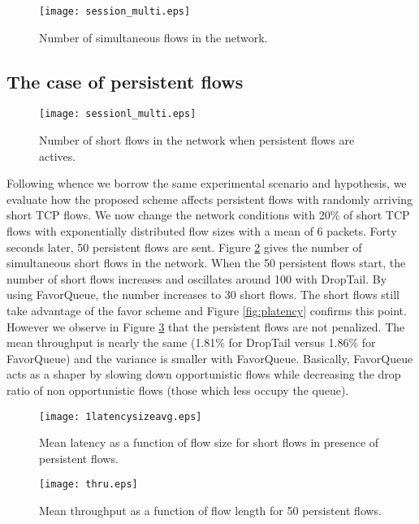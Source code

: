 \documentclass{elsart}
\begin{document}
\begin{figure}[ht]
\begin{center}
\texttt{[image: session\_multi.eps]}
\end{center}
\caption{Number of simultaneous flows in the network.}
\label{fig:session}
\end{figure}

\subsection{The case of persistent flows}
\label{subsec:persistent}

\begin{figure}[htb!]
\begin{center}
\texttt{[image: sessionl\_multi.eps]}
\end{center}
\caption{Number of short flows in the network when persistent flows are actives.}
\label{fig:sessionl}
\end{figure}


Following \cite{avrachenkov04} whence we borrow the same experimental scenario and hypothesis, we evaluate how the proposed scheme affects persistent flows with randomly arriving short TCP flows.
We now change the network conditions with 20\% of short TCP flows with exponentially distributed flow sizes with a mean of 6 packets. Forty seconds later, 50 persistent flows are sent. Figure \ref{fig:sessionl} gives 
the number of simultaneous short flows in the network. When the 50 persistent flows start, the number of short flows increases and oscillates around 100 with DropTail. By using FavorQueue, the number increases to 30 short flows. 
The short flows still take advantage of the favor scheme and Figure \ref{fig:platency} confirms this point. However we observe in Figure \ref{fig:pthru} that the persistent flows are not penalized. The mean throughput is 
nearly the same (1.81\% for DropTail versus 1.86\% for FavorQueue) and the variance is smaller with FavorQueue. 
Basically, FavorQueue acts as a shaper by slowing down opportunistic flows while decreasing the drop ratio of non opportunistic flows (those which less occupy the queue). 

\begin{figure}[htb!]
   \begin{minipage}[b]{1.0\columnwidth}
	\centering
	\texttt{[image: 1latencysizeavg.eps]}
	\caption{Mean latency as a function of flow size for short flows in presence of persistent flows.}
	\label{fig:platency}
   \end{minipage}

   \begin{minipage}[b]{1.0\columnwidth}   
	\centering
	\texttt{[image: thru.eps]}
	\caption{Mean throughput as a function of flow length for 50 persistent flows.}
	\label{fig:pthru}
   \end{minipage}
\end{figure}
\end{document}
